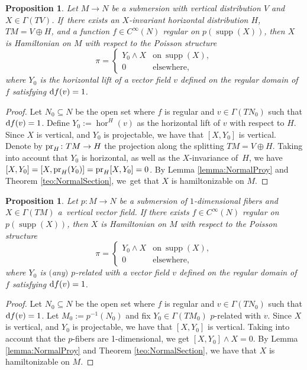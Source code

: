 \documentclass[pdftex]{sigma}%
\newcommand{\dd}{{\rm d}}
\numberwithin{equation}{section}
\newtheorem{Proposition}[Theorem]{Proposition}
 { \theoremstyle{definition}
\newtheorem{Definition}[Theorem]{Definition}
\newtheorem{Note}[Theorem]{Note}
\newtheorem{Example}[Theorem]{Example}
\newtheorem{Remark}[Theorem]{Remark} }
\begin{document}
\begin{Proposition}\label{prop:HinvHam}
Let $M \to N$ be a submersion with vertical distribution $V$ and $X \in \Gamma(TV)$. If~there exists an $X$-invariant horizontal distribution $H$, $TM = V \oplus H$, and a function $f \in C^{\infty}(N)$ regular on $p(\operatorname{supp}(X))$, then $X$ is Hamiltonian on $M$ with respect to the Poisson structure
 \begin{equation*}
 \pi = \begin{cases}
 Y_0 \wedge X & \text{on} \ \operatorname{supp}(X),\\
 0 & \text{elsewhere},
 \end{cases}
 \end{equation*}
where $Y_{0}$ is the horizontal lift of a vector field $v$ defined on the regular domain of $f$ satisfying $\dd f(v)=1$.
\end{Proposition}
\begin{proof}
Let $N_0 \subseteq N$ be the open set where $f$ is regular and $v \in \Gamma(TN_{0})$ such that $\dd{f}(v) = 1$. Define $Y_{0}:=\operatorname{hor}^H(v)$ as the horizontal lift of $v$ with respect to $H$. Since $X$ is vertical, and $Y_0$ is projectable, we have that $[X,Y_0]$ is vertical. Denote by ${\rm pr}_{H}\colon TM \to H$ the projection along the splitting $TM=V \oplus H$. Taking into account that $Y_0$ is horizontal, as well as the $X$-invariance of~$H$, we have $[X,Y_0] = [X,{\rm pr}_{H}(Y_0)] = {\rm pr}_{H}[X,Y_0] = 0$. By Lemma \ref{lemma:NormalProy} and Theorem \ref{teo:NormalSection}, we~get that $X$ is hamiltonizable on $M$.
\end{proof}

\begin{Proposition}\label{prop:HTransInv2}
Let $p\colon M \to N$ be a submersion of $1$-dimensional fibers and $X \in \Gamma(TM)$ a~ver\-ti\-cal vector field. If there exists $f \in C^{\infty}(N)$ regular on $p(\operatorname{supp}(X))$, then $X$ is Hamiltonian on $M$ with respect to the Poisson structure
 \begin{equation*}
 \pi = \begin{cases}
 Y_0 \wedge X & \text{on}  \  \operatorname{supp}(X),
 \\
 0 & \text{elsewhere},
 \end{cases}
 \end{equation*}
where $Y_{0}$ is $($any$)$ $p$-related with a vector field $v$ defined on the regular domain of $f$ satisfying $\dd f(v)=1$.
\end{Proposition}
\begin{proof}
Let $N_0 \subseteq N$ be the open set where $f$ is regular and $v \in \Gamma(TN_{0})$ such that $\dd{f}(v) = 1$. Let $M_0:=p^{-1}(N_0)$ and fix $Y_{0} \in \Gamma(TM_{0})$ $p$-related with $v$. Since $X$ is vertical, and $Y_0$ is projectable, we have that $[X,Y_0]$ is vertical. Taking into account that the $p$-fibers are 1-dimensional, we get $[X,Y_0]\wedge X=0$. By Lemma \ref{lemma:NormalProy} and Theorem \ref{teo:NormalSection}, we have that $X$ is hamiltonizable on $M$.
\end{proof}
\end{document}
